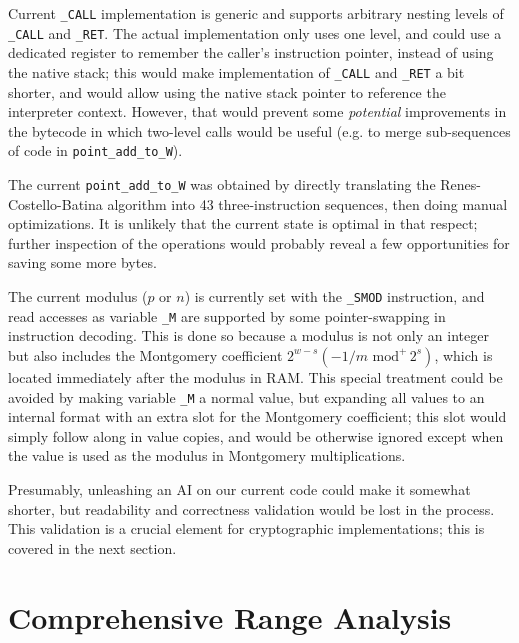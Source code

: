 \documentclass{llncs}
\newcommand{\umod}[2]{#1 \,\,\text{mod}^{+}\, #2}
\begin{document}
Current \verb+_CALL+ implementation is generic and supports arbitrary
nesting levels of \verb+_CALL+ and \verb+_RET+. The actual
implementation only uses one level, and could use a dedicated register
to remember the caller's instruction pointer, instead of using the
native stack; this would make implementation of \verb+_CALL+ and
\verb+_RET+ a bit shorter, and would allow using the native stack
pointer to reference the interpreter context. However, that would
prevent some \emph{potential} improvements in the bytecode in which
two-level calls would be useful (e.g. to merge sub-sequences of code in
\verb+point_add_to_W+).

The current \verb+point_add_to_W+ was obtained by directly translating
the Renes-Costello-Batina algorithm into 43 three-instruction sequences,
then doing manual optimizations. It is unlikely that the current state
is optimal in that respect; further inspection of the operations would
probably reveal a few opportunities for saving some more bytes.

The current modulus ($p$ or $n$) is currently set with the \verb+_SMOD+
instruction, and read accesses as variable \verb+_M+ are supported by
some pointer-swapping in instruction decoding. This is done so because a
modulus is not only an integer but also includes the Montgomery
coefficient $2^{w-s}(\umod{-1/m}{2^s})$, which is located immediately
after the modulus in RAM. This special treatment could be avoided by
making variable \verb+_M+ a normal value, but expanding all values to an
internal format with an extra slot for the Montgomery coefficient; this
slot would simply follow along in value copies, and would be otherwise
ignored except when the value is used as the modulus in Montgomery
multiplications.

Presumably, unleashing an AI on our current code could make it somewhat
shorter, but readability and correctness validation would be lost in the
process. This validation is a crucial element for cryptographic
implementations; this is covered in the next section.


\newpage
\section{Comprehensive Range Analysis}\label{sec:range}
\end{document}
